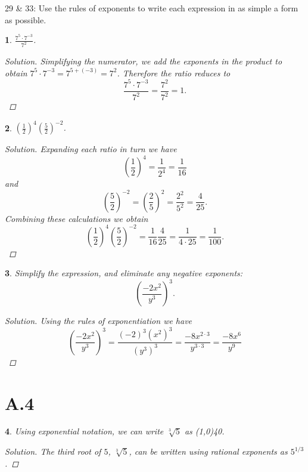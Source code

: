 \documentclass[12pt]{amsart}
\newtheorem{thm}{}
\begin{document}
29 \& 33:  Use the rules of exponents to write each expression in as simple a form as possible.
\setcounter{thm}{28}
\begin{thm}
  $\displaystyle{\frac{7^5 \cdot 7^{-3}}{7^2}}$.
  
  \begin{proof}[Solution]
    Simplifying the numerator, we add the exponents in the product to obtain $7^5 \cdot 7^{-3} = 7^{5 + (-3)} = 7^2$.
    Therefore the ratio reduces to
    $$\frac{7^5 \cdot 7^{-3}}{7^2} = \frac{7^2}{7^2} = 1.$$
  \end{proof}
\end{thm}

\setcounter{thm}{32}
\begin{thm}
  $\displaystyle{\left(\frac{1}{2}\right)^4 \left(\frac{5}{2}\right)^{-2}}$.
  
  \begin{proof}[Solution]
    Expanding each ratio in turn we have
    $$\left(\frac{1}{2}\right)^4 = \frac{1}{2^4} = \frac{1}{16}$$
    and
    $$\left(\frac{5}{2}\right)^{-2} = \left(\frac{2}{5}\right)^2 = \frac{2^2}{5^2} = \frac{4}{25}.$$
    Combining these calculations we obtain
    $$\left(\frac{1}{2}\right)^4 \left(\frac{5}{2}\right)^{-2} = \frac{1}{16}\frac{4}{25} = \frac{1}{4\cdot 25} = \frac{1}{100}.$$
  \end{proof}
\end{thm}

\setcounter{thm}{51}
\begin{thm}
  Simplify the expression, and eliminate any negative exponents:
  $$\left(\frac{-2x^2}{y^3}\right)^3.$$
  
  \begin{proof}[Solution]
    Using the rules of exponentiation we have
    $$\left(\frac{-2x^2}{y^3}\right)^3 = \frac{(-2)^3(x^2)^3}{(y^3)^3} = \frac{-8x^{2\cdot 3}}{y^{3 \cdot 3}} = \frac{-8x^6}{y^9}$$
  \end{proof}
\end{thm}

\section*{A.4}

\setcounter{thm}{0}
\begin{thm}
  Using exponential notation, we can write $\sqrt[3]{5}$ as \line(1,0){40}.
  
  \begin{proof}[Solution]
    The third root of $5$, $\sqrt[3]{5}$, can be written using rational exponents as $5^{1/3}$.
  \end{proof}
\end{thm}
\end{document}
